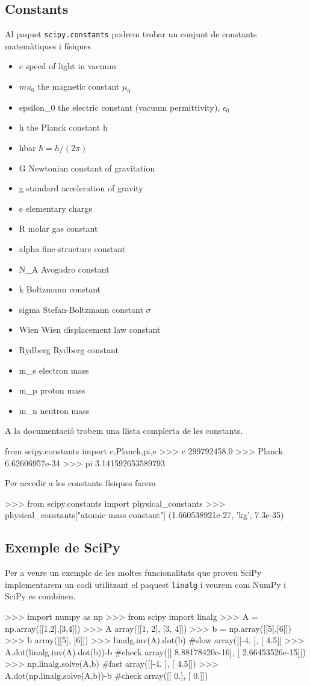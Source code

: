 \subsection{Constants}
Al paquet {\tt scipy.constants} podrem trobar un conjunt de constants matemàtiques i físiques
\begin{itemize}
\item c         speed of light in vacuum
\item $mu_0$    the magnetic constant $\mu_0$
\item epsilon\_0        the electric constant (vacuum permittivity), $\epsilon_0$
\item h         the Planck constant h
\item hbar      $\hbar = h/(2\pi)$
\item G         Newtonian constant of gravitation
\item g         standard acceleration of gravity
\item e         elementary charge
\item R         molar gas constant
\item alpha     fine-structure constant
\item N\_A      Avogadro constant
\item k         Boltzmann constant
\item sigma     Stefan-Boltzmann constant $\sigma$
\item Wien      Wien displacement law constant
\item Rydberg   Rydberg constant
\item m\_e      electron mass
\item m\_p      proton mass
\item m\_n      neutron mass
\end{itemize}
A la documentació trobem una llista complerta de les constants\cite{constants}.
\begin{blockcode}
from scipy.constants import c,Planck,pi,e
>>> c
299792458.0
>>> Planck
6.62606957e-34
>>> pi
3.141592653589793
\end{blockcode}
Per accedir a les constants físiques farem
\begin{blockcode}
>>> from scipy.constants import physical_constants
>>> physical_constants["atomic mass constant"]
(1.660538921e-27, 'kg', 7.3e-35)
\end{blockcode}
\subsection{Exemple de SciPy}
Per a veure un exemple de les moltes funcionalitats que proveu SciPy implementarem un codi utilitzant el paquest {\tt linalg} i veurem com NumPy i SciPy es combinen.
\begin{blockcode}
>>> import numpy as np
>>> from scipy import linalg
>>> A = np.array([[1,2],[3,4]])
>>> A
array([[1, 2],
      [3, 4]])
>>> b = np.array([[5],[6]])
>>> b
array([[5],
      [6]])
>>> linalg.inv(A).dot(b) #slow
array([[-4. ],
      [ 4.5]]
>>> A.dot(linalg.inv(A).dot(b))-b #check
array([[  8.88178420e-16],
      [  2.66453526e-15]])
>>> np.linalg.solve(A,b) #fast
array([[-4. ],
      [ 4.5]])
>>> A.dot(np.linalg.solve(A,b))-b #check
array([[ 0.],
      [ 0.]])
\end{blockcode}
